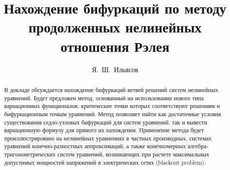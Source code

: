 \fi

\title{Нахождение бифуркаций по методу продолженных нелинейных отношения Рэлея}
\author{Я.~Ш.~Ильясов  }


\maketitle

\begin{abstract}

В докладе обсуждается нахождение бифуркаций ветвей решений систем нелинейных уравнений. Будет предложен метод, основанный на использовании нового типа вариационных функционалов, критические точки которых соответствуют решениям и бифуркационным точкам уравнений. Метод позволяет найти как достаточные условия существования седло-узловых бифуркаций для систем уравнений, так и вывести вариационную формулу для прямого их нахождения.  
Применение метода будет проиллюстрировано на нелинейных уравнениях в частных производных, системах уравнений конечно-разностных аппроксимаций, а также конечномерных  алгебра-тригонометрических систем уравнений, возникающих при расчете максимальных допустимых мощностей напряжений в электрических сетях  (blackout problem).

\end{abstract}

\iffalse 
\begin{thebibliography}{9} %
	

\bibitem{3} Y. Il'yasov. \newblock Finding Saddle-Node Bifurcations via a Nonlinear Generalized Collatz–Wielandt Formula. \newblock {  International Journal of Bifurcation and Chaos}. 2021. Vol. 31, no. 1. 2150008.
	
\bibitem{2} Y. Il'yasov, A finding of the maximal saddle-node bifurcation for systems of differential equations. Journal of Differential Equations.   2024. Vol. 378. Pp.   610--625.
	
\bibitem{Salazar} P. D. P. Salazar, Y. Il'yasov, L. F. C. Alberto,  E. C. M. Costa \& M. B. Salles.  \newblock Saddle-node bifurcations of power systems in the context of variational theory and nonsmooth optimization, \newblock {  IEEE Access}. 2020. Vol. 8. Pp. 110986--110993.
	
\bibitem{1} Y.S. Il'yasov,   Ivanov, A.A. 2016, Computation of maximal turning points to nonlinear  equations by nonsmooth optimization.   {Optim. Meth. and   Softw.}. Vol.  {31}, no 1. Pp. 1--23.

\end{thebibliography}
\fi 




%

